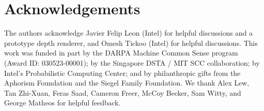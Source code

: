 
\section{Acknowledgements}

The authors acknowledge Javier Felip Leon (Intel) for helpful
discussions and a prototype depth renderer, and Omesh Tickoo (Intel)
for helpful discussions. This work was funded in part by the DARPA
Machine Common Sense program (Award ID: 030523-00001); by the
Singapore DSTA / MIT SCC collaboration; by Intel's Probabilistic
Computing Center; and by philanthropic gifts from the Aphorism
Foundation and the Siegel Family Foundation. We thank Alex Lew, Tan Zhi-Xuan, Feras Saad, Cameron Freer, McCoy Becker, Sam Witty, and George Matheos for helpful feedback.

\newpage